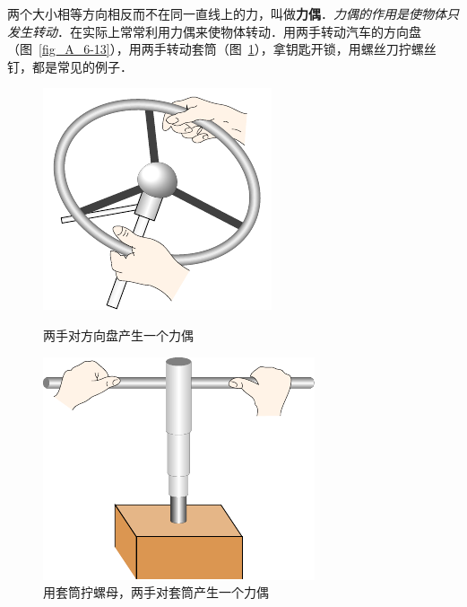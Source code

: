 两个大小相等方向相反而不在同一直线上的力，叫做\textbf{力偶}．\textit{力偶的作用是使物体只发生转动}．在实际上常常利用力偶来使物体转动．用两手转动汽车的方向盘（图~\ref{fig_A_6-13}），用两手转动套筒（图~\ref{fig_A_6-14}），拿钥匙开锁，用螺丝刀拧螺丝钉，都是常见的例子．
\begin{figure}[htbp]
    \centering
    \begin{minipage}[t]{0.48\textwidth}
        \centering
        \includegraphics{fig/A/6-13.pdf}
        \caption{两手对方向盘产生一个力偶}\label{fig_A_6-13}
    \end{minipage}
    \hfill
    \begin{minipage}[t]{0.48\textwidth}
        \centering
        \includegraphics{fig/A/6-14.pdf}
        \caption{用套筒拧螺母，两手对套筒产生一个力偶}\label{fig_A_6-14}
    \end{minipage}
\end{figure}

